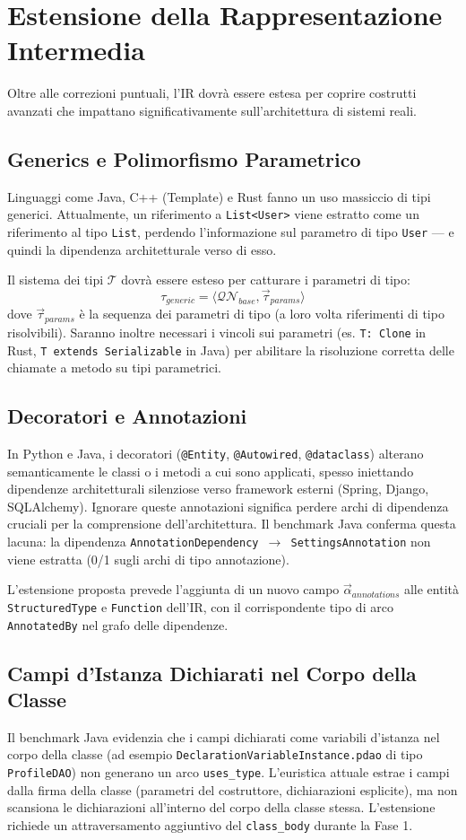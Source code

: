 \section{Estensione della Rappresentazione Intermedia}
Oltre alle correzioni puntuali, l'IR dovrà essere estesa per coprire
costrutti avanzati che impattano significativamente sull'architettura
di sistemi reali.

\subsection{Generics e Polimorfismo Parametrico}
Linguaggi come Java, C++ (Template) e Rust fanno un uso massiccio di
tipi generici. Attualmente, un riferimento a \texttt{List<User>}
viene estratto come un riferimento al tipo \texttt{List}, perdendo
l'informazione sul parametro di tipo \texttt{User} --- e quindi la
dipendenza architetturale verso di esso.

Il sistema dei tipi $\mathcal{T}$ dovrà essere esteso per catturare i
parametri di tipo:
$$\tau_{generic} = \langle \mathcal{QN}_{base}, \vec{\tau}_{params} \rangle$$
dove $\vec{\tau}_{params}$ è la sequenza dei parametri di tipo (a loro
volta riferimenti di tipo risolvibili). Saranno inoltre necessari i
vincoli sui parametri (es. \texttt{T: Clone} in Rust,
\texttt{T extends Serializable} in Java) per abilitare la risoluzione
corretta delle chiamate a metodo su tipi parametrici.

\subsection{Decoratori e Annotazioni}
In Python e Java, i decoratori (\texttt{@Entity}, \texttt{@Autowired},
\texttt{@dataclass}) alterano semanticamente le classi o i metodi a
cui sono applicati, spesso iniettando dipendenze architetturali
silenziose verso framework esterni (Spring, Django, SQLAlchemy).
Ignorare queste annotazioni significa perdere archi di dipendenza
cruciali per la comprensione dell'architettura. Il benchmark Java
conferma questa lacuna: la dipendenza
\texttt{AnnotationDependency $\to$ SettingsAnnotation} non viene
estratta (0/1 sugli archi di tipo annotazione).

L'estensione proposta prevede l'aggiunta di un nuovo campo
$\vec{\alpha}_{annotations}$ alle entità \texttt{StructuredType} e
\texttt{Function} dell'IR, con il corrispondente tipo di arco
\texttt{AnnotatedBy} nel grafo delle dipendenze.

\subsection{Campi d'Istanza Dichiarati nel Corpo della Classe}
Il benchmark Java evidenzia che i campi dichiarati come variabili
d'istanza nel corpo della classe (ad esempio
  \texttt{DeclarationVariableInstance.pdao} di tipo
\texttt{ProfileDAO}) non generano un arco \texttt{uses\_type}.
L'euristica attuale estrae i campi dalla firma della classe
(parametri del costruttore, dichiarazioni esplicite), ma non
scansiona le dichiarazioni all'interno del corpo della classe stessa.
L'estensione richiede un attraversamento aggiuntivo del
\texttt{class\_body} durante la Fase 1.

